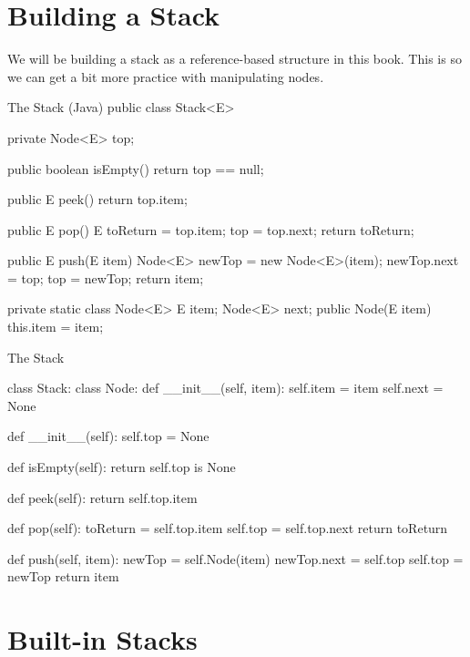 \section{Building a Stack}

We will be building a stack as a reference-based structure in this book.  This is so we can get a bit more practice with manipulating nodes.


	

\begin{javacode}{The Stack (Java)}
public class Stack<E> {
	private Node<E> top;
	
	public boolean isEmpty(){
		return top == null;
	}
	
	public E peek() {
		return top.item;
	}
	
	public E pop() {
		E toReturn =  top.item;
		top = top.next;
		return toReturn;
	}
	
	public E push(E item){
		Node<E> newTop = new Node<E>(item);
		newTop.next = top;
		top = newTop;
		return item;
	}
	
	private static class Node<E>{
		E item;
		Node<E> next;
		public Node(E item) {
			this.item = item;
		}
	}	
}\end{javacode}





\begin{pycode}{The Stack}
	
class Stack:
	class Node:
		def __init__(self, item):
			self.item = item
			self.next = None
	
	def __init__(self):
		self.top = None
	
	def isEmpty(self):
		return self.top is None
	
	def peek(self):
		return self.top.item
	
	def pop(self):
		toReturn = self.top.item
		self.top = self.top.next
		return toReturn
		
	def push(self, item):
		newTop = self.Node(item)
		newTop.next = self.top
		self.top = newTop
		return item
\end{pycode}


\section{Built-in Stacks}

